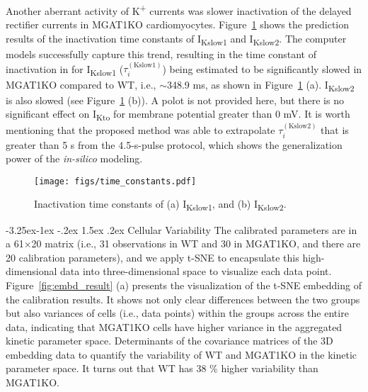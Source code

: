 \documentclass[11pt]{article}
\makeatletter
\renewcommand\subsection{\@startsection{subsection}{2}{\z@}%
                                     {-3.25ex\@plus -1ex \@minus -.2ex}%
                                     {1.5ex \@plus .2ex}%
                                     {\normalfont\fontfamily{phv}\fontsize{14}{17}\bfseries}}
\makeatother
\begin{document}
Another aberrant activity of K\textsuperscript{+} currents was slower inactivation of the delayed rectifier currents in MGAT1KO cardiomyocytes. Figure~\ref{fig:time_constants} shows the prediction results of the inactivation time constants of I\textsubscript{Kslow1} and I\textsubscript{Kslow2}. The computer models successfully capture this trend, resulting in the time constant of inactivation in for I\textsubscript{Kslow1} ($\tau_{i}^{(\mathrm{Kslow1})}$) being estimated to be significantly slowed in MGAT1KO compared to WT, i.e., $\sim$348.9 ms, as shown in Figure~\ref{fig:time_constants} (a). I\textsubscript{Kslow2} is also slowed (see Figure~\ref{fig:time_constants} (b)). A polot is not provided here, but there is no significant effect on I\textsubscript{Kto} for membrane potential greater than 0 mV. It is worth mentioning that the proposed method was able to extrapolate $\tau_{i}^{(\mathrm{Kslow2})}$ that is greater than 5 s from the 4.5-s-pulse protocol, which shows the generalization power of the \textit{in-silico} modeling.
\begin{figure}[!ht]
    \centering
    \texttt{[image: figs/time\_constants.pdf]}
    \caption{Inactivation time constants of (a) I\textsubscript{Kslow1}, and (b) I\textsubscript{Kslow2}.}
    \label{fig:time_constants}
\end{figure}

\subsection{Cellular Variability}
The calibrated parameters are in a 61×20 matrix (i.e., 31 observations in WT and 30 in MGAT1KO, and there are 20 calibration parameters), and we apply t-SNE to encapsulate this high-dimensional data into three-dimensional space to visualize each data point. Figure~\ref{fig:embd_result} (a) presents the visualization of the t-SNE embedding of the calibration results. It shows not only clear differences between the two groups but also variances of cells (i.e., data points) within the groups across the entire data, indicating that MGAT1KO cells have higher variance in the aggregated kinetic parameter space. Determinants of the covariance matrices of the 3D embedding data to quantify the variability of WT and MGAT1KO in the kinetic parameter space. It turns out that WT has 38 \% higher variability than MGAT1KO. 
\end{document}
